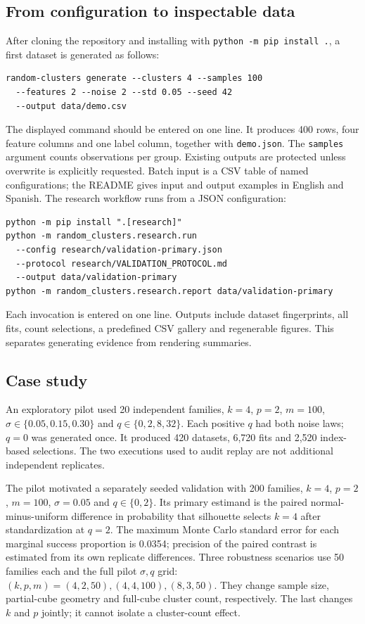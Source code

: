 \documentclass[preprint,12pt]{elsarticle}
\begin{document}
\subsection{From configuration to inspectable data}
After cloning the repository and installing with \texttt{python -m pip install .},
a first dataset is generated as follows:
\begin{lstlisting}
random-clusters generate --clusters 4 --samples 100
  --features 2 --noise 2 --std 0.05 --seed 42
  --output data/demo.csv
\end{lstlisting}
The displayed command should be entered on one line. It produces 400 rows,
four feature columns and one label column, together with \texttt{demo.json}.
The \texttt{samples} argument counts observations per group. Existing outputs
are protected unless overwrite is explicitly requested. Batch input is a CSV
table of named configurations; the README gives input and output examples in
English and Spanish. The research workflow runs from a JSON configuration:
\begin{lstlisting}
python -m pip install ".[research]"
python -m random_clusters.research.run
  --config research/validation-primary.json
  --protocol research/VALIDATION_PROTOCOL.md
  --output data/validation-primary
python -m random_clusters.research.report data/validation-primary
\end{lstlisting}
Each invocation is entered on one line. Outputs include dataset fingerprints,
all fits, count selections, a predefined CSV gallery and regenerable figures.
This separates generating evidence from rendering summaries.

\subsection{Case study}
An exploratory pilot used 20 independent families, $k=4$, $p=2$, $m=100$,
$\sigma\in\{0.05,0.15,0.30\}$ and $q\in\{0,2,8,32\}$. Each positive $q$
had both noise laws; $q=0$ was generated once. It produced 420 datasets,
6,720 fits and 2,520 index-based selections. The two executions used to audit
replay are not additional independent replicates.

The pilot motivated a separately seeded validation with 200 families,
$k=4$, $p=2$, $m=100$, $\sigma=0.05$ and $q\in\{0,2\}$. Its primary
estimand is the paired normal-minus-uniform difference in probability that
silhouette selects $k=4$ after standardization at $q=2$. The maximum Monte
Carlo standard error for each marginal success proportion is 0.0354; precision
of the paired contrast is estimated from its own replicate differences.
Three robustness scenarios use 50 families each and the full pilot
$\sigma,q$ grid: $(k,p,m)=(4,2,50),(4,4,100),(8,3,50)$. They change sample
size, partial-cube geometry and full-cube cluster count, respectively. The last
changes $k$ and $p$ jointly; it cannot isolate a cluster-count effect.
\end{document}
